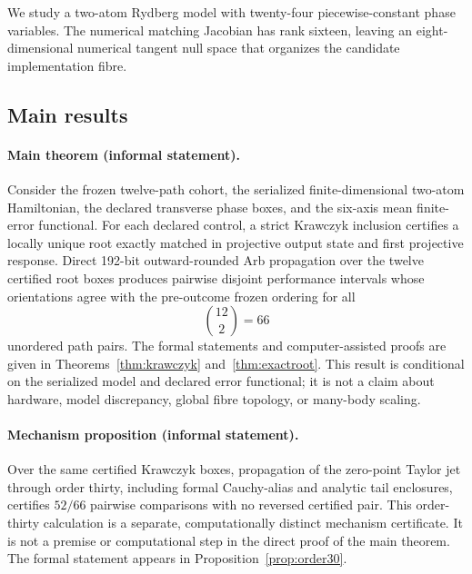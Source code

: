\documentclass[11pt]{article}
\begin{document}
We study a two-atom Rydberg model with twenty-four piecewise-constant phase
variables. The numerical matching Jacobian has rank sixteen, leaving an
eight-dimensional numerical tangent null space that organizes the candidate
implementation fibre.

\subsection{Main results}

\paragraph{Main theorem (informal statement).}
Consider the frozen twelve-path cohort, the serialized finite-dimensional
two-atom Hamiltonian, the declared transverse phase boxes, and the six-axis
mean finite-error functional. For each declared control, a strict Krawczyk
inclusion certifies a locally unique root exactly matched in projective output
state and first projective response. Direct 192-bit outward-rounded Arb
propagation over the twelve certified root boxes produces pairwise disjoint
performance intervals whose orientations agree with the pre-outcome frozen
ordering for all
\[
\binom{12}{2}=66
\]
unordered path pairs. The formal statements and computer-assisted proofs are
given in Theorems~\ref{thm:krawczyk} and~\ref{thm:exactroot}. This result is
conditional on the serialized model and declared error functional; it is not
a claim about hardware, model discrepancy, global fibre topology, or
many-body scaling.

\paragraph{Mechanism proposition (informal statement).}
Over the same certified Krawczyk boxes, propagation of the zero-point Taylor
jet through order thirty, including formal Cauchy-alias and analytic tail
enclosures, certifies $52/66$ pairwise comparisons with no reversed certified
pair. This order-thirty calculation is a separate, computationally distinct
mechanism certificate. It is not a premise or computational step in the
direct proof of the main theorem. The formal statement appears in
Proposition~\ref{prop:order30}.
\end{document}
